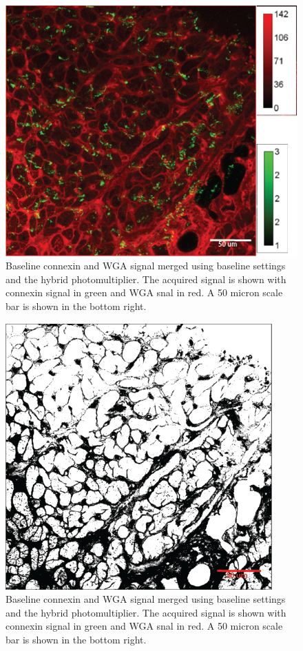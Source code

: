 \documentclass[12pt]{article}
\begin{document}
\begin{figure}
	
		\centering
		\includegraphics[width=.95\textwidth]{FinalFigures/BaselineMerge.png}
		
	\caption{Baseline connexin and WGA signal merged using baseline settings and the hybrid photomultiplier. The acquired signal is shown with connexin signal in green and WGA snal in red. A 50 micron scale bar is shown in the bottom right.}
	\label{fig:base_merge}
\end{figure}

\begin{figure}
	
	\centering
	\includegraphics[width=.95\textwidth]{FinalFigures/WGA_Baseline_Binary.png}
	
	\caption{Baseline connexin and WGA signal merged using baseline settings and the hybrid photomultiplier. The acquired signal is shown with connexin signal in green and WGA snal in red. A 50 micron scale bar is shown in the bottom right.}
	\label{fig:base_binary}
\end{figure}
\end{document}
